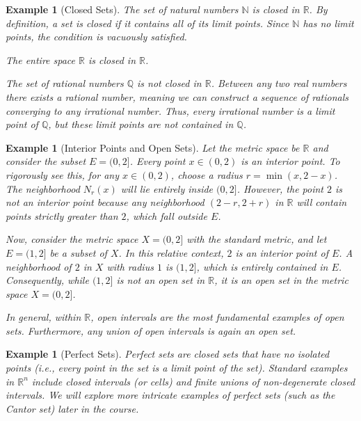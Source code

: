 \documentclass{article}
\theoremstyle{mythm}
\newtheorem{example}[theorem]{Example}
\begin{document}
\begin{example}[Closed Sets]
The set of natural numbers $\mathbb{N}$ is closed in $\mathbb{R}$. By definition, a set is closed if it contains all of its limit points. Since $\mathbb{N}$ has no limit points, the condition is vacuously satisfied. 

The entire space $\mathbb{R}$ is closed in $\mathbb{R}$. 

The set of rational numbers $\mathbb{Q}$ is not closed in $\mathbb{R}$. Between any two real numbers there exists a rational number, meaning we can construct a sequence of rationals converging to any irrational number. Thus, every irrational number is a limit point of $\mathbb{Q}$, but these limit points are not contained in $\mathbb{Q}$.
\end{example}

\begin{example}[Interior Points and Open Sets]
Let the metric space be $\mathbb{R}$ and consider the subset $E = (0, 2]$. Every point $x \in (0, 2)$ is an interior point. To rigorously see this, for any $x \in (0, 2)$, choose a radius $r = \min(x, 2 - x)$. The neighborhood $N_r(x)$ will lie entirely inside $(0, 2]$. However, the point $2$ is not an interior point because any neighborhood $(2 - r, 2 + r)$ in $\mathbb{R}$ will contain points strictly greater than $2$, which fall outside $E$. 

Now, consider the metric space $X = (0, 2]$ with the standard metric, and let $E = (1, 2]$ be a subset of $X$. In this relative context, $2$ \textit{is} an interior point of $E$. A neighborhood of $2$ in $X$ with radius $1$ is $(1, 2]$, which is entirely contained in $E$. Consequently, while $(1, 2]$ is not an open set in $\mathbb{R}$, it \textit{is} an open set in the metric space $X = (0, 2]$.

In general, within $\mathbb{R}$, open intervals are the most fundamental examples of open sets. Furthermore, any union of open intervals is again an open set.
\end{example}

\begin{example}[Perfect Sets]
Perfect sets are closed sets that have no isolated points (i.e., every point in the set is a limit point of the set). Standard examples in $\mathbb{R}^n$ include closed intervals (or cells) and finite unions of non-degenerate closed intervals. We will explore more intricate examples of perfect sets (such as the Cantor set) later in the course.
\end{example}
\end{document}
